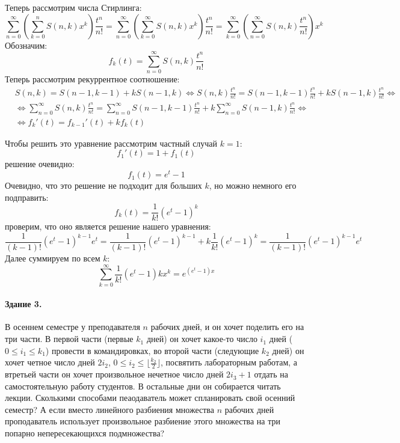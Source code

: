 \documentclass[a4paper,12pt]{article}
\begin{document}
\begin{Solution}
Теперь рассмотрим числа Стирлинга:
\[
	\sum_{n=0}^{\infty} \left(\sum_{k=0}^n S\left(n,k\right) x^k\right) \frac{t^n}{n!} = \sum_{n=0}^{\infty} \left(\sum_{k=0}^{\infty} S\left(n,k\right) x^k\right) \frac{t^n}{n!} = \sum_{k=0}^{\infty} \left(\sum_{n=0}^{\infty} S\left(n,k\right) \frac{t^n}{n!}\right) x^k
\]
Обозначим:
\[
	f_k \left(t\right) = \sum_{n=0}^{\infty} S\left(n,k\right) \frac{t^n}{n!}
\]
Теперь рассмотрим рекуррентное соотношение:
\[
	\begin{split}
		& S\left(n,k\right) = S\left(n-1,k-1\right) + k S\left(n-1,k\right) \Leftrightarrow S\left(n,k\right)\frac{t^n}{n!} = S\left(n-1,k-1\right)\frac{t^n}{n!} + k S\left(n-1,k\right) \frac{t^n}{n!} \Leftrightarrow \\
		& \Leftrightarrow \sum_{n=0}^{\infty} S\left(n,k\right) \frac{t^n}{n!} = \sum_{n=0}^{\infty} S\left(n-1,k-1\right) \frac{t^n}{n!} + k \sum_{n=0}^{\infty} S\left(n-1,k\right) \frac{t^n}{n!} \Leftrightarrow \\
		& \Leftrightarrow f_{k}'\left(t\right) = f_{k-1}'\left(t\right) + k f_k\left(t\right)
	\end{split}
\]

Чтобы решить это уравнение рассмотрим частный случай $k=1$:
\[
	f_1'\left(t\right) = 1 + f_1\left(t\right)
\]
решение очевидно:
\[
	f_1\left(t\right) = e^t - 1
\]
Очевидно, что это решение не подходит для больших $k$, но можно немного его подправить:
\[
	f_k\left(t\right) = \frac{1}{k!} \left(e^t - 1\right)^k
\]
проверим, что оно является решение нашего уравнения:
\[
	\frac{1}{\left(k-1\right)!}\left(e^t - 1\right)^{k-1} e^t = \frac{1}{\left(k-1\right)!} \left(e^t - 1\right)^{k-1} + k \frac{1}{k!}\left(e^t - 1\right)^k = \frac{1}{\left(k-1\right)!} \left(e^t - 1\right)^{k-1} e^t
\]
Далее суммируем по всем $k$:
\[
	\sum_{k=0}^{\infty} \frac{1}{k!}\left(e^t - 1\right)k x^k = e^{\left(e^t-1\right)x}
\]
\end{Solution}

\paragraph{Здание 3.} В осеннем семестре у преподавателя $n$ рабочих дней, и он хочет поделить его на три части. В первой части (первые $k_1$ дней) он хочет какое-то число $i_1$ дней ($0 \le i_1 \le k_1$) провести в командировках, во второй части (следующие $k_2$ дней) он хочет четное число дней $2 i_2$, $0 \le i_2 \le \lfloor \frac{k_2}{2} \rfloor$, посвятить лабораторным работам, а втретьей части он хочет произвольное нечетное число дней $2 i_3 + 1$ отдать на самостоятельную работу студентов. В остальные дни он собирается читать лекции. Сколькими способами пеаодаватель может спланировать свой осенний семестр? А если вместо линейного разбиения множества $n$ рабочих дней проподаватель использует произвольное разбиение этого множества на три попарно непересекающихся подмножества?
\end{document}

